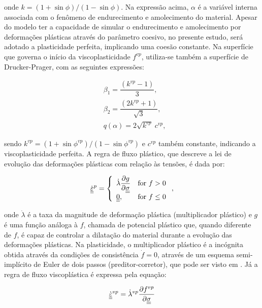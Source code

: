 onde $k = (1+\sin{\phi})/(1-\sin{\phi})$. Na expressão acima, $\alpha$ é a variável interna associada com o fenômeno de endurecimento e amolecimento do material. Apesar do modelo ter a capacidade de simular o endurecimento e amolecimento por deformações plásticas através do parâmetro coesivo, no presente estudo, será adotado a plasticidade perfeita, implicando  uma coesão constante. Na superfície que governa o início da viscoplasticidade $f^{vp}$, utiliza-se também a superfície de Drucker-Prager, com as seguintes expressões:

\begin{equation}
\begin{aligned}
	& \beta_1 = \dfrac{(k^{vp}-1)}{3}, \\
	& \beta_2 = \dfrac{(2k^{vp}+1)}{\sqrt{3}}, \\
	& q(\alpha) = 2 \sqrt{k^{vp}} \ c^{vp},
\end{aligned}
\end{equation}

sendo $k^{vp} = (1+\sin{\phi^{vp}})/(1-\sin{\phi^{vp}})$ e $c^{vp}$ também constante, indicando a viscoplasticidade perfeita. A regra de fluxo plástico, que descreve a lei de evolução das deformações plásticas com relação às tensões, é dada por:

\begin{equation}
\dot {\underline{\underline \varepsilon}}^p = \left\{ 
\begin{array}{ll} 
	\dot \lambda \dfrac{\partial g}{\partial \underline{\underline \sigma}} &  \text{for } f > 0 \\ 
	\underline{\underline 0}, & \text{for } f \le 0 \\
\end{array}\right.,
\end{equation}

onde $\dot \lambda$ é a taxa da magnitude de deformação plástica (multiplicador plástico) e $g$ é uma função análoga à $f$, chamada de potencial plástico que, quando diferente de $f$, é capaz de controlar a dilatação do material durante a evolução das deformações plásticas. Na plasticidade, o multiplicador plástico é a incógnita obtida através da condições de consistência $\dot f = 0$, através de um esquema semi-implícito de Euler de dois passos (preditor-corretor), que pode ser visto em . Já a regra de fluxo viscoplástica é expressa pela equação:

\begin{equation}
\dot {\underline{\underline \varepsilon}}^{vp} = \dot \lambda^{vp} \dfrac{\partial f^{vp}}{\partial \underline{\underline \sigma}}
\end{equation}

